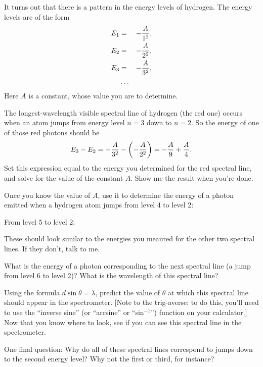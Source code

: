 It turns out that there is a pattern in the energy levels of hydrogen.
The energy levels are of the form
\begin{eqnarray*}
E_1&=&-{A\over 1^2},\\
E_2&=&-{A\over 2^2},\\
E_3&=&-{A\over 3^2},\\
&\ldots&
\end{eqnarray*}
Here $A$ is a constant, whose value you are to determine.

The longest-wavelength visible spectral line of hydrogen
(the red one) occurs when an atom jumps from energy level $n=3$
down to $n=2$.  So the energy of one of those red photons should be
$$
E_3-E_2=-{A\over 3^2}-\left(-{A\over 2^2}\right)=-{A\over 9}+{A\over 4}.
$$
Set this expression equal to the energy you determined for the red spectral
line, and solve for the value of the constant $A$.  Show me the
result when you're done.

\vskip 2.5in

Once you know the value of $A$, use it to determine the energy of a photon
emitted when a hydrogen atom jumps from level 4 to level 2:

\vskip 1in

From level 5 to level 2:

\vskip 1in

These should look similar to the energies you meaured for the other
two spectral lines.  If they don't, talk to me.

What is the energy of a photon corresponding to the next spectral line
(a jump from level 6 to level 2)?  What is the wavelength of 
this spectral line?

\vskip 1.5in

Using the formula $d\sin\theta=\lambda$, predict the value of $\theta$
at which this spectral line should appear in the spectrometer.
[Note to the trig-averse: to do this, you'll need to use the ``inverse
sine'' (or ``arcsine'' or ``sin$^{-1}$'') function on your calculator.]
Now that you know where to look, see if you can see this spectral line
in the spectrometer.

\vskip 1in

One final question: Why do all of these spectral lines correspond
to jumps down to the second energy level?  Why not the first or third,
for instance?


